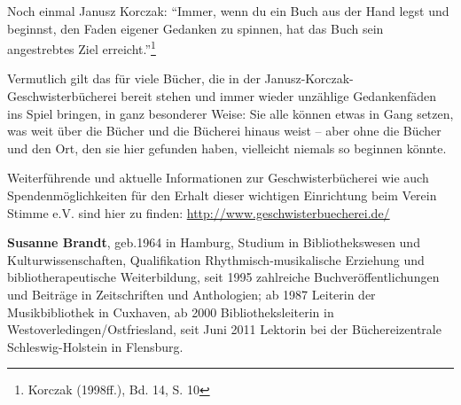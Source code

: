 \documentclass[a4paper,
fontsize=11pt,
oneside,
numbers=noperiodatend,
parskip=half-,
bibliography=totoc,
final
]{scrartcl}
\begin{document}
Noch einmal Janusz Korczak: \enquote{Immer, wenn du ein Buch aus der
Hand legst und beginnst, den Faden eigener Gedanken zu spinnen, hat das
Buch sein angestrebtes Ziel erreicht.}\footnote{Korczak (1998ff.), Bd.
  14, S. 10}

Vermutlich gilt das für viele Bücher, die in der
Janusz-Korczak-Geschwisterbücherei bereit stehen und immer wieder
unzählige Gedankenfäden ins Spiel bringen, in ganz besonderer Weise: Sie
alle können etwas in Gang setzen, was weit über die Bücher und die
Bücherei hinaus weist -- aber ohne die Bücher und den Ort, den sie hier
gefunden haben, vielleicht niemals so beginnen könnte.

Weiterführende und aktuelle Informationen zur Geschwisterbücherei wie
auch Spendenmöglichkeiten für den Erhalt dieser wichtigen Einrichtung
beim Verein Stimme e.V. sind hier zu finden:
\url{http://www.geschwisterbuecherei.de/}

\textbf{Susanne Brandt}, geb.1964 in Hamburg, Studium in
Bibliothekswesen und Kulturwissenschaften, Qualifikation
Rhythmisch-musikalische Erziehung und bibliotherapeutische
Weiterbildung, seit 1995 zahlreiche Buchveröffentlichungen und Beiträge
in Zeitschriften und Anthologien; ab 1987 Leiterin der Musikbibliothek
in Cuxhaven, ab 2000 Bibliotheksleiterin in
Westoverledingen/Ostfriesland, seit Juni 2011 Lektorin bei der
Büchereizentrale Schleswig-Holstein in Flensburg.
\end{document}
